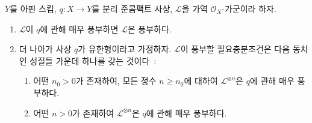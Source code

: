 \begin{proposition}[4.5.10]
\label{II.4.5.10-ko}
$Y$를 아핀 스킴, $q:X\to Y$를 분리 준콤팩트 사상,
$\mathcal{L}$을 가역 $\mathcal{O}_X$-가군이라 하자.
\begin{enumerate}
  \item[\rm{(i)}] $\mathcal{L}$이 $q$에 관해 매우 풍부하면
  $\mathcal{L}$은 풍부하다.
  \item[\rm{(ii)}] 더 나아가 사상 $q$가 유한형이라고 가정하자.
  $\mathcal{L}$이 풍부할 필요충분조건은 다음 동치인 성질들 가운데
  하나를 갖는 것이다~:
  \begin{enumerate}
    \item[\rm{e)}] 어떤 $n_0>0$가 존재하여, 모든 정수 $n\geq n_0$에
    대하여 $\mathcal{L}^{\otimes n}$은 $q$에 관해 매우 풍부하다.
    \item[\rm{e')}] 어떤 $n>0$가 존재하여
    $\mathcal{L}^{\otimes n}$은 $q$에 관해 매우 풍부하다.
  \end{enumerate}
\end{enumerate}
\end{proposition}

